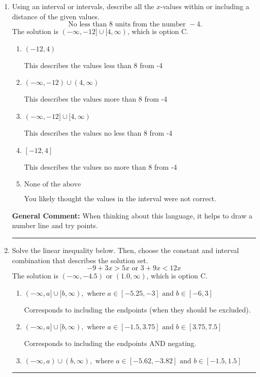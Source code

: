 \documentclass{extbook}[14pt]
\newcommand{\litem}[1]{\item #1

\rule{\textwidth}{0.4pt}}
\begin{document}
\begin{enumerate}
{\begin{enumerate}[label=\Alph*.]
You may have chosen this if you thought the inequality did not match the ends of the intervals.
\end{enumerate}

\textbf{General Comment:} Remember that less/greater than or equal to includes the endpoint, while less/greater do not. Also, remember that you need to flip the inequality when you multiply or divide by a negative.
}
\litem{
Using an interval or intervals, describe all the $x$-values within or including a distance of the given values.
\[ \text{ No less than } 8 \text{ units from the number } -4. \]The solution is \( (-\infty, -12] \cup [4, \infty) \), which is option C.\begin{enumerate}[label=\Alph*.]
\item \( (-12, 4) \)

This describes the values less than 8 from -4
\item \( (-\infty, -12) \cup (4, \infty) \)

This describes the values more than 8 from -4
\item \( (-\infty, -12] \cup [4, \infty) \)

This describes the values no less than 8 from -4
\item \( [-12, 4] \)

This describes the values no more than 8 from -4
\item \( \text{None of the above} \)

You likely thought the values in the interval were not correct.
\end{enumerate}

\textbf{General Comment:} When thinking about this language, it helps to draw a number line and try points.
}
\litem{
Solve the linear inequality below. Then, choose the constant and interval combination that describes the solution set.
\[ -9 + 3 x > 5 x \text{ or } 3 + 9 x < 12 x \]The solution is \( (-\infty, -4.5) \text{ or } (1.0, \infty) \), which is option C.\begin{enumerate}[label=\Alph*.]
\item \( (-\infty, a] \cup [b, \infty), \text{ where } a \in [-5.25, -3] \text{ and } b \in [-6, 3] \)

Corresponds to including the endpoints (when they should be excluded).
\item \( (-\infty, a] \cup [b, \infty), \text{ where } a \in [-1.5, 3.75] \text{ and } b \in [3.75, 7.5] \)

Corresponds to including the endpoints AND negating.
\item \( (-\infty, a) \cup (b, \infty), \text{ where } a \in [-5.62, -3.82] \text{ and } b \in [-1.5, 1.5] \)


\end{enumerate}}
\end{enumerate}
\end{document}
